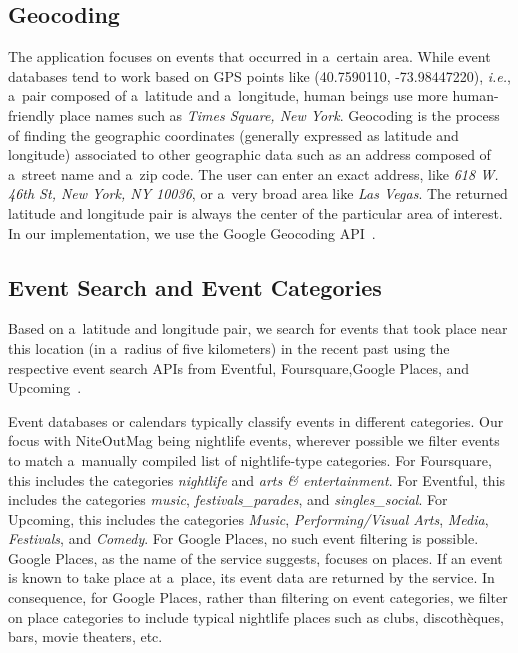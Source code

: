 \documentclass[runningheads,a4paper]{llncs}
\begin{document}
{\subsection{Geocoding}                                                      \label{sec:geocoding}
The application focuses on events that occurred in a~certain area. While event databases tend to work based on GPS points like
(40.7590110, -73.98447220), \emph{i.e.}, a~pair composed of a~latitude and a~longitude, human beings use more human-friendly place names such as \emph{Times Square, New York}. Geocoding is the process of finding the geographic coordinates (generally expressed as latitude and longitude) associated to other geographic data such as an address composed of a~street name and a~zip code. The user can enter an exact address, like \emph{618 W. 46th St, New York, NY 10036}, or a~very broad area like \emph{Las Vegas}. The returned latitude and longitude pair is always the center of the particular area of interest. In our implementation, we use the Google Geocoding API~\cite{Geocoding2012}.

\subsection{Event Search and Event Categories}                              \label{sec:event-search}
Based on a~latitude and longitude pair, we search for events that took place near this location (in a~radius of five kilometers) in the recent past using the respective event search APIs from Eventful, Foursquare,Google Places, and Upcoming~\cite{Eventful2012,Foursquare2012,GooglePlaces2012,Upcoming2012}.

Event databases or calendars typically classify events in different categories. Our focus with NiteOutMag being nightlife events, wherever possible we filter events to match a~manually compiled list of nightlife-type categories. For Foursquare, this includes the categories \emph{nightlife} and \emph{arts \& entertainment}. For Eventful, this includes the categories \emph{music}, \emph{festivals\_parades}, and \emph{singles\_social}. For Upcoming, this includes the categories \emph{Music}, \emph{Performing/Visual Arts}, \emph{Media}, \emph{Festivals}, and \emph{Comedy}. For Google Places, no such event filtering is possible. Google Places, as the name of the service suggests, focuses on places. If an event is known to take place at a~place, its event data are returned by the service. In consequence, for Google Places, rather than filtering on event categories, we filter on place categories to include typical nightlife places
such as clubs, discoth\`eques, bars, movie theaters, etc.

}
\end{document}
